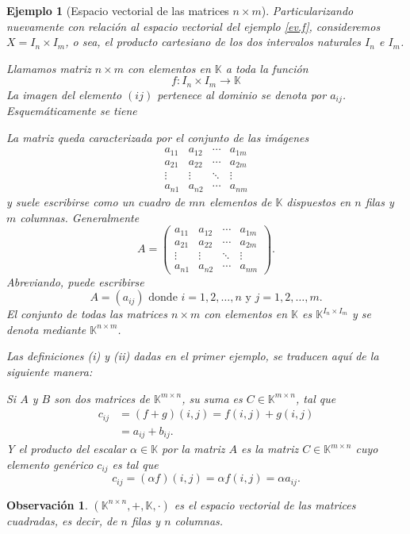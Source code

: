 \documentclass[b5paper, 11pt]{book}
\newcommand{\0}{\mathbf{0}}
\newcommand{\K}{\mathds{K}}
\newtheorem{obs}{Observación}[chapter]
\theoremstyle{estiloB}
\newtheorem{ejemg}{Ejemplo}[chapter]
\theoremstyle{estiloC}
\theoremstyle{estiloD}
\begin{document}
\begin{ejemg}[Espacio vectorial de las matrices $n \times m$]
Particularizando nuevamente con relación al espacio vectorial del ejemplo \ref{ev.f}, consideremos $X= I_n \times I_m$, o sea, el producto cartesiano de los dos intervalos naturales $I_n$ e $I_m$.

Llamamos matriz $n \times m$ con elementos en $\K$ a toda la función
\[
f: I_n \times I_m \to \K
\]
La imagen del elemento $(ij)$ pertenece al dominio se denota por $a_{ij}$. Esquemáticamente se tiene

La matriz queda caracterizada por el conjunto de las imágenes
\[
\begin{array}{cccc}
a_{11} & a_{12} & \cdots & a_{1m} \\ 
a_{21} & a_{22} & \cdots & a_{2m} \\ 
\vdots & \vdots & \ddots & \vdots \\ 
a_{n1} & a_{n2} & \cdots & a_{nm}
\end{array} 
\]
y suele escribirse como un cuadro de $mn$ elementos de $\K$ dispuestos en $n$ filas y $m$ columnas. Generalmente
\[
A=
\begin{pmatrix}
a_{11} & a_{12} & \cdots & a_{1m} \\ 
a_{21} & a_{22} & \cdots & a_{2m} \\ 
\vdots & \vdots & \ddots & \vdots \\ 
a_{n1} & a_{n2} & \cdots & a_{nm}
\end{pmatrix}. 
\]
Abreviando, puede escribirse
\[
A= (a_{ij}) \text{ donde } i=1,2, \ldots, n \text{ y } j=1,2, \ldots ,m.
\]
El conjunto de todas las matrices $n \times m$ con elementos en $\K$ es $\K^{I_n \times I_m}$ y se denota mediante $\K^{n \times m}$.

Las definiciones \textit{(i)} y \textit{(ii)} dadas en el primer ejemplo, se traducen aquí de la siguiente manera:

Si $A$ y $B$ son dos matrices de $\K^{m \times n}$, su suma es $C \in \K^{m \times n}$, tal que
\begin{align*}
c_{ij}	&= (f+g)(i,j)= f(i,j)+ g(i,j)\\
		&=a_{ij}+ b_{ij}.
\end{align*}
Y el producto del escalar $\alpha \in \K$ por la matriz $A$ es la matriz $C \in \K^{m \times n}$ cuyo elemento genérico $c_{ij}$ es tal que
\[
c_{ij}= (\alpha f)(i,j)= \alpha f(i,j)= \alpha a_{ij}.
\]
\end{ejemg}
\begin{obs}
$(\K^{n\times n}, +, \K, \cdot)$ es el espacio vectorial de las matrices cuadradas, es decir, de $n$ filas y $n$ columnas.
\end{obs}
\end{document}
